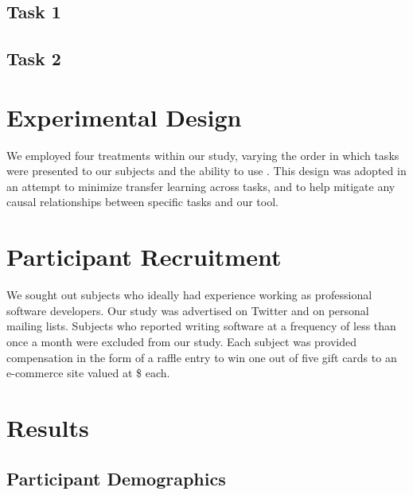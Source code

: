 \subsection{Task 1}
\label{subsec:TaskOne}

\subsection{Task 2}
\label{subsec:TaskTwo}

\section{Experimental Design}
\label{sec:ExperimentalDesign}

We employed four treatments within our study, varying the order in which tasks
were presented to our subjects and the ability to use \toolname{}.
This design was adopted in an attempt to minimize transfer learning across
tasks, and to help mitigate any causal relationships between specific tasks
and our tool. 


\section{Participant Recruitment}
\label{sec:Recruitment}

We sought out subjects who ideally had experience working as professional
software developers.
Our study was advertised on Twitter and on personal mailing lists.
Subjects who reported writing software at a frequency of less than once a month 
were excluded from our study.
Each subject was provided compensation in the form of a raffle entry to win
one out of five gift cards to an e-commerce site valued at \$\cardamount{} each.

\section{Results}
\label{sec:UserStudyResults}

\subsection{Participant Demographics}
\label{subsec:UserStudyDemographics}

\endinput
